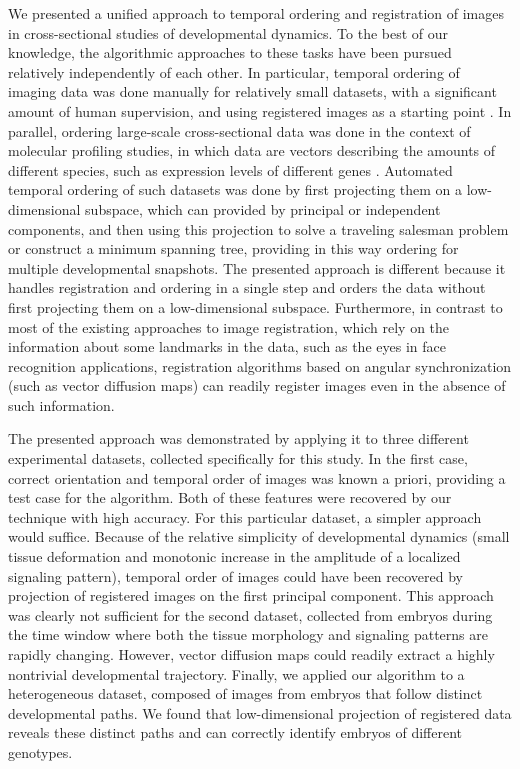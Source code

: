 \documentclass{pnastwo}
\begin{document}
\begin{article}
We presented a unified approach to temporal ordering and registration of images in cross-sectional studies of developmental dynamics. 
%
To the best of our knowledge, the algorithmic approaches to these tasks have been pursued relatively independently of each other. 
%
In particular, temporal ordering of imaging data was done manually for relatively small datasets, with a significant amount of human supervision, and using registered images as a starting point \cite{...}.  
%
In parallel, ordering large-scale cross-sectional data was done in the context of molecular profiling studies, in which data are vectors describing the amounts of different species, such as expression levels of different genes \cite{anavy2014blind, trapnell2014dynamics,gupta2008extracting, qiu2011discovering}. 
%
Automated temporal ordering of such datasets was done by first projecting them on a low-dimensional subspace, which can provided by principal or independent components, and then using this projection to solve a traveling salesman problem or construct a minimum spanning tree, providing in this way ordering for multiple developmental snapshots. 
%
The presented approach is different because it handles registration and ordering in a single step and orders the data without first projecting them on a low-dimensional subspace. 
%
Furthermore, in contrast to most of the existing approaches to image registration, which rely on the information about some landmarks in the data, such as the eyes in face recognition applications, registration algorithms based on angular synchronization (such as vector diffusion maps) can readily register images even in the absence of such information.  

The presented approach was demonstrated by applying it to three different experimental datasets, collected specifically for this study. 
%
In the first case, correct orientation and temporal order of images was known a priori, providing a test case for the algorithm.  
%
Both of these features were recovered by our technique with high accuracy. For this particular dataset, a simpler approach would suffice. 
%
Because of the relative simplicity of developmental dynamics (small tissue deformation and monotonic increase in the amplitude of a localized signaling pattern), temporal order of images could have been recovered by projection of registered images on the first principal component. 
%
This approach was clearly not sufficient for the second dataset, collected from embryos during the time window where both the tissue morphology and signaling patterns are rapidly changing.  
%
However, vector diffusion maps could readily extract a highly nontrivial developmental trajectory. 
%
Finally, we applied our algorithm to a heterogeneous dataset, composed of images from embryos that follow distinct developmental paths. 
%
We found that low-dimensional projection of registered data reveals these distinct paths and can correctly identify embryos of different genotypes. 


\end{article}
\end{document}
